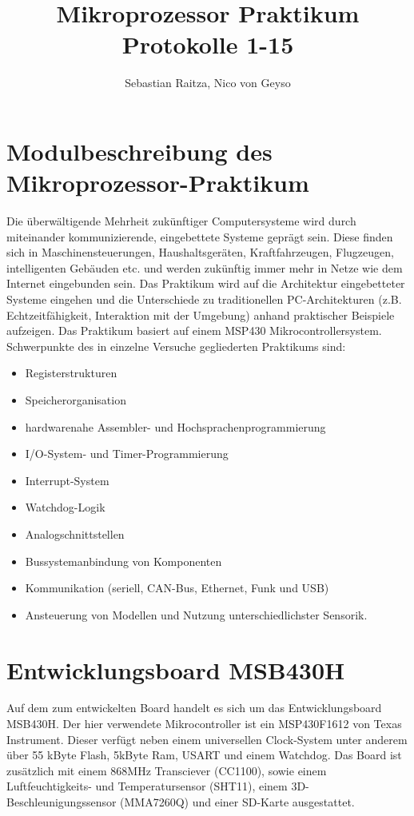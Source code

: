 \documentclass[11pt,german]{scrartcl}
\title{Mikroprozessor Praktikum\\Protokolle 1-15}
\author{Sebastian Raitza, Nico von Geyso}
\begin{document}
\maketitle

\section{Modulbeschreibung des Mikroprozessor-Praktikum}
Die überwältigende Mehrheit zukünftiger Computersysteme wird durch miteinander kommunizierende, eingebettete Systeme geprägt sein.
Diese finden sich in Maschinensteuerungen, Haushaltsgeräten, Kraftfahrzeugen, Flugzeugen, intelligenten Gebäuden etc. und
werden zukünftig immer mehr in Netze wie dem Internet eingebunden sein.
Das Praktikum wird auf die Architektur eingebetteter Systeme eingehen und die Unterschiede zu traditionellen PC-Architekturen
(z.B. Echtzeitfähigkeit, Interaktion mit der Umgebung) anhand praktischer Beispiele aufzeigen.
Das Praktikum basiert auf einem MSP430 Mikrocontrollersystem.
Schwerpunkte des in einzelne Versuche gegliederten Praktikums sind:
\begin{itemize}
    \item Registerstrukturen
    \item Speicherorganisation
    \item hardwarenahe Assembler- und Hochsprachenprogrammierung
    \item I/O-System- und Timer-Programmierung
    \item Interrupt-System
    \item Watchdog-Logik
    \item Analogschnittstellen
    \item Bussystemanbindung von Komponenten
    \item Kommunikation (seriell, CAN-Bus, Ethernet, Funk und USB)
    \item Ansteuerung von Modellen und Nutzung unterschiedlichster Sensorik.
\end{itemize}


\section{Entwicklungsboard MSB430H}
Auf dem zum entwickelten Board handelt es sich um das Entwicklungsboard MSB430H.
Der hier verwendete Mikrocontroller ist ein MSP430F1612 von Texas Instrument.
Dieser verfügt neben einem universellen Clock-System unter anderem über 55 kByte Flash, 5kByte Ram, USART und einem Watchdog.
Das Board ist zusätzlich mit einem 868MHz Transciever (CC1100),
sowie einem Luftfeuchtigkeits- und Temperatursensor (SHT11), einem 3D-Beschleunigungssensor (MMA7260Q)
und einer SD-Karte ausgestattet.
\end{document}

